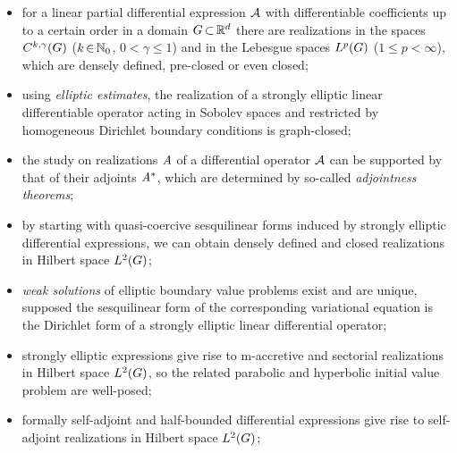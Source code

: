 \documentclass[11pt,twoside]{article}
\begin{document}
\begin{itemize}[leftmargin=2mm,itemsep=4pt]
\item[-] 
for a linear partial differential expression ${\mathcal{A}}$
with differentiable coefficients up to a certain order
in a domain $G {\,\subset\,} {\mathbb{R}}^d$
there are realizations
in the {\HOELDER} spaces $C^{k,\gamma}(G)$
($k {\,\in\,} {\mathbb{N}}_0$, $0 < \gamma \leq 1$)
and in the Lebesgue spaces $L^p(G)$ ($1 \leq p < \infty$),
which are densely defined, pre-closed or even closed;

\item[-] 
using \textit{elliptic estimates},
the realization of a strongly elliptic linear differentiable operator
acting in Sobolev spaces
and restricted by homogeneous Dirichlet boundary conditions
is graph-closed;

\item[-] 
the study on realizations $\mathit{A}$ of a differential operator ${\mathcal{A}}$
can be supported by that of their adjoints $\mathit{A}^*$,
which are determined by so-called \textit{adjointness theorems};

\item[-] 
by starting with quasi-coercive sesquilinear forms
induced by strongly elliptic differential expressions,
we can obtain densely defined and closed realizations in Hilbert space $L^2(G)$;

\item[-] 
\textit{weak solutions} of elliptic boundary value problems exist
and are unique,
supposed the sesquilinear form of the corresponding variational equation
is the Dirichlet form of a strongly elliptic linear differential operator;

\item[-] 
strongly elliptic expressions give rise to m-accretive
and sectorial realizations in Hilbert space $L^2(G)$,
so the related parabolic and hyperbolic initial value problem are well-posed;

\item[-] 
formally self-adjoint and half-bounded differential expressions
give rise to self-adjoint realizations in Hilbert space $L^2(G)$;
\end{itemize}
\end{document}

